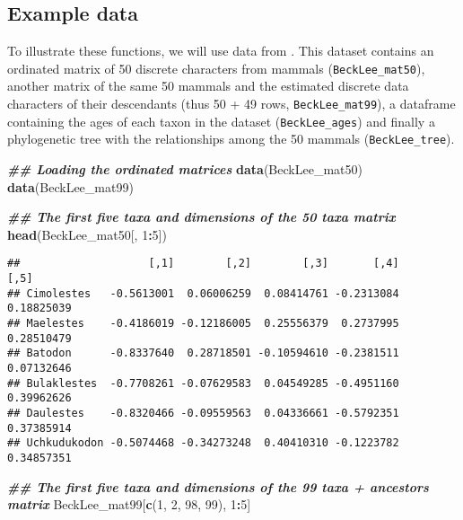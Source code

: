 \documentclass[
]{book}
\newenvironment{Shaded}{\begin{snugshade}}{\end{snugshade}}
\newcommand{\DecValTok}[1]{\textcolor[rgb]{0.00,0.00,0.81}{#1}}
\newcommand{\DocumentationTok}[1]{\textcolor[rgb]{0.56,0.35,0.01}{\textbf{\textit{#1}}}}
\newcommand{\FunctionTok}[1]{\textcolor[rgb]{0.13,0.29,0.53}{\textbf{#1}}}
\newcommand{\NormalTok}[1]{#1}
\newcommand{\SpecialCharTok}[1]{\textcolor[rgb]{0.81,0.36,0.00}{\textbf{#1}}}
\begin{document}
\hypertarget{example-data}{%
\subsection{Example data}\label{example-data}}

To illustrate these functions, we will use data from \citet{beckancient2014}.
This dataset contains an ordinated matrix of 50 discrete characters from mammals (\texttt{BeckLee\_mat50}), another matrix of the same 50 mammals and the estimated discrete data characters of their descendants (thus 50 + 49 rows, \texttt{BeckLee\_mat99}), a dataframe containing the ages of each taxon in the dataset (\texttt{BeckLee\_ages}) and finally a phylogenetic tree with the relationships among the 50 mammals (\texttt{BeckLee\_tree}).

\begin{Shaded}
\begin{Highlighting}[]
\DocumentationTok{\#\# Loading the ordinated matrices}
\FunctionTok{data}\NormalTok{(BeckLee\_mat50)}
\FunctionTok{data}\NormalTok{(BeckLee\_mat99)}

\DocumentationTok{\#\# The first five taxa and dimensions of the 50 taxa matrix}
\FunctionTok{head}\NormalTok{(BeckLee\_mat50[, }\DecValTok{1}\SpecialCharTok{:}\DecValTok{5}\NormalTok{])}
\end{Highlighting}
\end{Shaded}

\begin{verbatim}
##                    [,1]        [,2]        [,3]       [,4]       [,5]
## Cimolestes   -0.5613001  0.06006259  0.08414761 -0.2313084 0.18825039
## Maelestes    -0.4186019 -0.12186005  0.25556379  0.2737995 0.28510479
## Batodon      -0.8337640  0.28718501 -0.10594610 -0.2381511 0.07132646
## Bulaklestes  -0.7708261 -0.07629583  0.04549285 -0.4951160 0.39962626
## Daulestes    -0.8320466 -0.09559563  0.04336661 -0.5792351 0.37385914
## Uchkudukodon -0.5074468 -0.34273248  0.40410310 -0.1223782 0.34857351
\end{verbatim}

\begin{Shaded}
\begin{Highlighting}[]
\DocumentationTok{\#\# The first five taxa and dimensions of the 99 taxa + ancestors matrix}
\NormalTok{BeckLee\_mat99[}\FunctionTok{c}\NormalTok{(}\DecValTok{1}\NormalTok{, }\DecValTok{2}\NormalTok{, }\DecValTok{98}\NormalTok{, }\DecValTok{99}\NormalTok{), }\DecValTok{1}\SpecialCharTok{:}\DecValTok{5}\NormalTok{]}
\end{Highlighting}
\end{Shaded}
\end{document}
